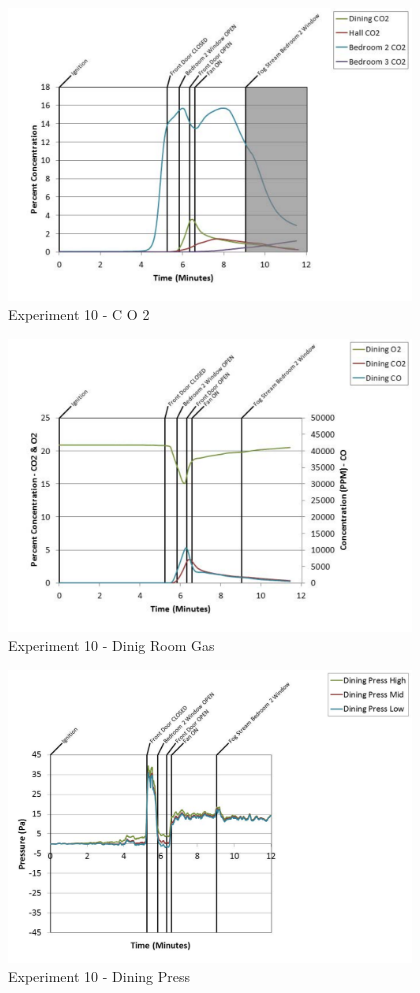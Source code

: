 \documentclass{article}
\begin{document}
\begin{appendices}
	\clearpage

	\begin{figure}[h!]
		\centering
		\includegraphics[height=3.05in]{0_Images/Results_Charts/Exp_10_Charts/CO2.pdf}
		\caption{Experiment 10 - C O 2}
	\end{figure}
 

	\begin{figure}[h!]
		\centering
		\includegraphics[height=3.05in]{0_Images/Results_Charts/Exp_10_Charts/DinigRoomGas.pdf}
		\caption{Experiment 10 - Dinig Room Gas}
	\end{figure}
 
	\clearpage

	\begin{figure}[h!]
		\centering
		\includegraphics[height=3.05in]{0_Images/Results_Charts/Exp_10_Charts/DiningPress.pdf}
		\caption{Experiment 10 - Dining Press}
	\end{figure}
 


\end{appendices}
\end{document}
